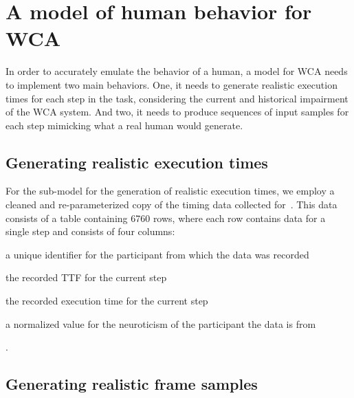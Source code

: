 \section{A model of human behavior for \ac{WCA}}\label{sec:model}


In order to accurately emulate the behavior of a human, a model for \ac{WCA} needs to implement two main behaviors.
One, it needs to generate realistic execution times for each step in the task, considering the current and historical impairment of the \ac{WCA} system.
And two, it needs to produce sequences of input samples for each step mimicking what a real human would generate.

\subsection{Generating realistic execution times}

For the sub-model for the generation of realistic execution times, we employ a cleaned and re-parameterized copy of the timing data collected for~\cite{olguinmunoz:impact2021}.
This data consists of a table containing \num{6760} rows, where each row contains data for a single step and consists of four columns:
\begin{enumerate*}[itemjoin={{; }}, itemjoin*={{; and }}]
    \item a unique identifier for the participant from which the data was recorded
    \item the recorded \acl{TTF} for the current step
    \item the recorded execution time for the current step
    \item a normalized value for the neuroticism of the participant the data is from
\end{enumerate*}.



\subsection{Generating realistic frame samples}


